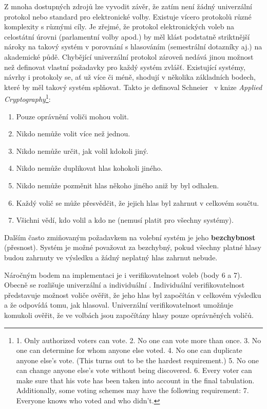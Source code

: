 \label{section:pozadavky}
Z mnoha dostupných zdrojů lze vyvodit závěr, že zatím není žádný univerzální protokol nebo standard pro elektronické volby. Existuje vícero protokolů různé komplexity s různými cíly. Je zřejmé, že protokol elektronických voleb na celostátní úrovni (parlamentní volby apod.) by měl klást podstatně striktnější nároky na takový systém v porovnání s hlasováním (semestrální dotazníky aj.)  na akademické půdě. Chybějící univerzální protokol zároveň nedává jinou možnost než definovat vlastní požadavky pro každý systém zvlášť.
\clearpage
Existující systémy, návrhy i protokoly se, ať už více či méně, shodují v několika základních bodech, které by měl takový systém splňovat. Takto je definoval Schneier~\cite{Schneier1996} v knize \textit{Applied Cryptography}\footnote{
1. Only authorized voters can vote.
2. No one can vote more than once.
3. No one can determine for whom anyone else voted.
4. No one can duplicate anyone else’s vote. (This turns out to be the
hardest requirement.)
5. No one can change anyone else’s vote without being discovered.
6. Every voter can make sure that his vote has been taken into account
in the final tabulation.
Additionally, some voting schemes may have the following requirement:
7. Everyone knows who voted and who didn’t.\cite{Schneier1996}
}:
\begin{enumerate}
	\item Pouze oprávnění voliči mohou volit.
	\item Nikdo nemůže volit více než jednou.
	\item Nikdo nemůže určit, jak volil kdokoli jiný.
	\item Nikdo nemůže duplikovat hlas kohokoli jiného.
	\item Nikdo nemůže pozměnit hlas někoho jiného aniž by byl odhalen.
	\item Každý volič se může přesvědčit, že jejich hlas byl zahrnut v celkovém součtu.
	\item Všichni vědí, kdo volil a kdo ne (nemusí platit pro všechny systémy).
\end{enumerate}


Dalším často zmiňovaným požadavkem na volební systém je jeho \textbf{bezchybnost} (přesnost). Systém je možné považovat za bezchybný, pokud všechny platné hlasy budou zahrnuty ve výsledku a žádný neplatný hlas zahrnut nebude.\cite{4285237}\cite{QADAH2007376}\cite{10.1007/978-3-642-03315-5_13}

Náročným bodem na implementaci je i verifikovatelnost voleb (body 6 a 7). Obecně se rozlišuje univerzální a individuální \cite{10.1007/978-3-642-03315-5_13} \cite{4285237}. Individuální verifikovatelnost představuje možnost voliče ověřit, že jeho hlas byl započítán v celkovém výsledku a že odpovídá tomu, jak hlasoval. Univerzální verifikovatelnost umožňuje komukoli ověřit, že ve volbách jsou započítány hlasy pouze oprávněných voličů.


